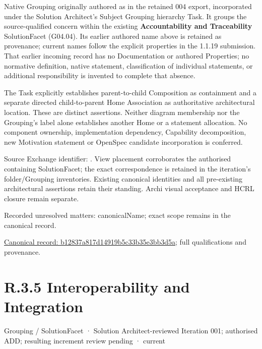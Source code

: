 Native Grouping originally authored as \texttt{} in the retained 004 export,
incorporated under the Solution Architect's Subject Grouping hierarchy Task.
It groups the source-qualified \texttt{} concern within
the existing \textbf{Accountability and Traceability} SolutionFacet (G04.04). Its earlier authored name above is retained as provenance; current names
follow the explicit properties in the 1.1.19 submission.
That earlier incoming record has no Documentation or authored Properties; no normative
definition, native statement, classification of individual statements, or
additional responsibility is invented to complete that absence.



The Task explicitly establishes parent-to-child Composition as containment and
a separate directed child-to-parent Home Association as authoritative architectural
location. These are distinct assertions. Neither diagram membership nor the
Grouping's label alone establishes another Home or a statement allocation.
No component ownership, implementation dependency, Capability decomposition,
new Motivation statement or OpenSpec candidate incorporation is conferred.



Source Exchange identifier: \texttt{}. View placement corroborates
the authorised containing SolutionFacet; the exact correspondence is retained in the
iteration's folder/Grouping inventories. Existing canonical identities and all
pre-existing architectural assertions retain their standing. Archi visual
acceptance and HCRL closure remain separate.


{\small Recorded unresolved matters: canonicalName; exact scope remains in the canonical record.}\par
{\footnotesize \href{../../../../../../../continuum/grouping/b12837a817d14919b5c33b35e3bb3d5a.md}{Canonical record: b12837a817d14919b5c33b35e3bb3d5a}; full qualifications and provenance.}\par
\section*{R.3.5 Interoperability and Integration}
\label{navigation:R.3.5}

\label{element:098d2e468cd14029b43ec6dbd07374fd}
{\small Grouping / SolutionFacet · Solution Architect-reviewed Iteration 001; authorised ADD; resulting increment review pending · current}\par


